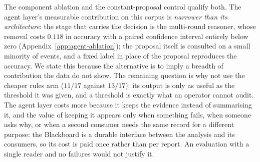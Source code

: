 The component ablation and the constant-proposal control qualify both. The
agent layer's measurable contribution on this corpus is \emph{narrower than
its architecture}: the stage that carries the decision is the multi-round
reasoner, whose removal costs $0.118$ in accuracy with a paired confidence
interval entirely below zero (Appendix~\ref{app:agent-ablation}); the
proposal itself is consulted on a small minority of events, and a fixed
label in place of the proposal reproduces the accuracy. We state this
because the alternative is to imply a breadth of contribution the data do
not show. The remaining question is why not use the cheaper rules arm
($11/17$ against $13/17$): its output is only as useful as the threshold
it was given, and a threshold is exactly what an operator cannot audit.
The agent layer costs more because it keeps the evidence instead of
summarising it, and the value of keeping it appears only when something
fails, when someone asks why, or when a second consumer needs the same
record for a different purpose: the Blackboard is a durable interface
between the analysis and its consumers, so its cost is paid once rather
than per report. An evaluation with a single reader and no failures would
not justify it.
